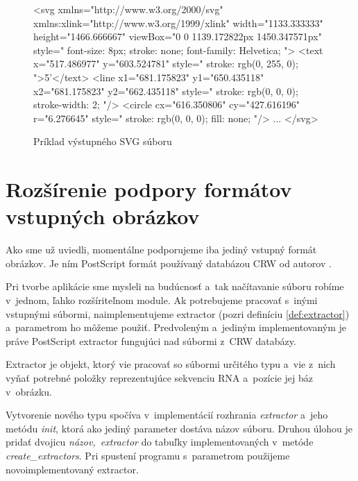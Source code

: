 \begin{figure}
\begin{code}[fontsize=\scriptsize, frame=none, samepage=true]
<svg xmlns="http://www.w3.org/2000/svg" xmlns:xlink="http://www.w3.org/1999/xlink"
  width="1133.333333" height="1466.666667" viewBox="0 0 1139.172822px 1450.347571px"
  style="
    font-size: 8px; 
    stroke: none; 
    font-family: Helvetica; ">
  <text 
    x="517.486977"
    y="603.524781"
    style="
      stroke: rgb(0, 255, 0); ">5'</text>
  <line 
    x1="681.175823"
    y1="650.435118" 
    x2="681.175823"
    y2="662.435118"
    style="
      stroke: rgb(0, 0, 0); 
      stroke-width: 2; "/>
  <circle 
    cx="616.350806"
    cy="427.616196"
    r="6.276645"
    style="
      stroke: rgb(0, 0, 0); 
      fill: none; "/>
  ...
</svg>
\end{code}
\caption{Príklad výstupného SVG súboru}
\label{obr:svg_out}
\end{figure}





\section{Rozšírenie podpory formátov vstupných obrázkov}
\label{kap:rozsirenie}

Ako sme už uviedli, momentálne podporujeme iba jediný vstupný formát obrázkov.
Je ním PostScript formát používaný databázou CRW od autorov \citet{CRW}.

Pri tvorbe aplikácie sme mysleli na budúcnosť a~tak načítavanie súboru
robíme v~jednom, ľahko rozšíriteľnom module.
Ak potrebujeme pracovať s~inými vstupnými súbormi, naimplementujeme extractor
(pozri definíciu \ref{def:extractor}) a~parametrom  ho môžeme použiť.
Predvoleným a~jediným implementovaným je práve PostScript extractor
fungujúci nad súbormi z~CRW databázy.

\begin{definice}
  Extractor je objekt, ktorý vie pracovať so súbormi určitého typu
  a~vie z~nich vyňať potrebné položky reprezentujúce sekvenciu RNA
  a~pozície jej báz v~obrázku.
  \label{def:extractor}
\end{definice}

\renewcommand{\tagt}[1]{\mbox{\textit{#1}}}

Vytvorenie nového typu spočíva v~implementácií rozhrania \tagt{extractor}
a~jeho metódu \tagt{init}, ktorá ako jediný parameter dostáva názov súboru.
Druhou úlohou je pridať dvojicu \tagt{názov, extractor} do tabuľky
implementovaných v~metóde \tagt{create\_extractors}.
Pri spustení programu s~parametrom  použijeme
novoimplementovaný extractor.



